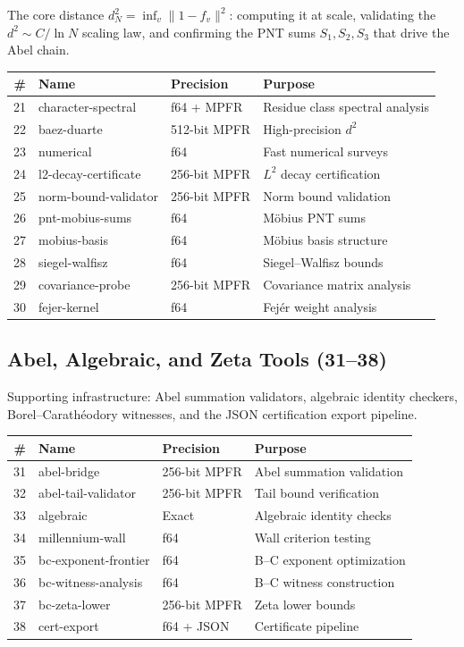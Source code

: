 \documentclass[11pt,a4paper]{article}
\begin{document}
The core distance $d_N^2 = \inf_v \|1 - f_v\|^2$: computing it
at scale, validating the $d^2 \sim C/\ln N$ scaling law, and
confirming the PNT sums $S_1, S_2, S_3$ that drive the Abel chain.

\begin{center}\small
\begin{tabular}{@{}rllp{5cm}@{}}
\toprule
\textbf{\#} & \textbf{Name} & \textbf{Precision} & \textbf{Purpose} \\
\midrule
21 & character-spectral & f64 + MPFR & Residue class spectral analysis \\
22 & baez-duarte & 512-bit MPFR & High-precision $d^2$ \\
23 & numerical & f64 & Fast numerical surveys \\
24 & l2-decay-certificate & 256-bit MPFR & $L^2$ decay certification \\
25 & norm-bound-validator & 256-bit MPFR & Norm bound validation \\
26 & pnt-mobius-sums & f64 & M\"obius PNT sums \\
27 & mobius-basis & f64 & M\"obius basis structure \\
28 & siegel-walfisz & f64 & Siegel--Walfisz bounds \\
29 & covariance-probe & 256-bit MPFR & Covariance matrix analysis \\
30 & fejer-kernel & f64 & Fej\'er weight analysis \\
\bottomrule
\end{tabular}
\end{center}

\subsection{Abel, Algebraic, and Zeta Tools (31--38)}

Supporting infrastructure: Abel summation validators, algebraic
identity checkers, Borel--Carath\'eodory witnesses, and the
JSON certification export pipeline.

\begin{center}\small
\begin{tabular}{@{}rllp{5cm}@{}}
\toprule
\textbf{\#} & \textbf{Name} & \textbf{Precision} & \textbf{Purpose} \\
\midrule
31 & abel-bridge & 256-bit MPFR & Abel summation validation \\
32 & abel-tail-validator & 256-bit MPFR & Tail bound verification \\
33 & algebraic & Exact & Algebraic identity checks \\
34 & millennium-wall & f64 & Wall criterion testing \\
35 & bc-exponent-frontier & f64 & B--C exponent optimization \\
36 & bc-witness-analysis & f64 & B--C witness construction \\
37 & bc-zeta-lower & 256-bit MPFR & Zeta lower bounds \\
38 & cert-export & f64 + JSON & Certificate pipeline \\
\bottomrule
\end{tabular}
\end{center}
\end{document}
